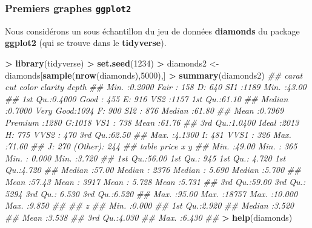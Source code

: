 \documentclass[]{article}
\newenvironment{Shaded}{\begin{snugshade}}{\end{snugshade}}
\newcommand{\CommentTok}[1]{\textcolor[rgb]{0.56,0.35,0.01}{\textit{#1}}}
\newcommand{\DecValTok}[1]{\textcolor[rgb]{0.00,0.00,0.81}{#1}}
\newcommand{\KeywordTok}[1]{\textcolor[rgb]{0.13,0.29,0.53}{\textbf{#1}}}
\newcommand{\NormalTok}[1]{#1}
\newcommand{\OperatorTok}[1]{\textcolor[rgb]{0.81,0.36,0.00}{\textbf{#1}}}
\newcommand{\StringTok}[1]{\textcolor[rgb]{0.31,0.60,0.02}{#1}}
\theoremstyle{definition}
\theoremstyle{definition}
\theoremstyle{definition}
\theoremstyle{remark}
\begin{document}
\hypertarget{premiers-graphes-ggplot2}{%
\subsubsection{\texorpdfstring{Premiers graphes \texttt{ggplot2}}{Premiers graphes ggplot2}}\label{premiers-graphes-ggplot2}}

Nous considérons un sous échantillon du jeu de données \textbf{diamonds} du package \textbf{ggplot2} (qui se trouve dans le \textbf{tidyverse}).

\begin{Shaded}
\begin{Highlighting}[]
\OperatorTok{>}\StringTok{ }\KeywordTok{library}\NormalTok{(tidyverse)}
\OperatorTok{>}\StringTok{ }\KeywordTok{set.seed}\NormalTok{(}\DecValTok{1234}\NormalTok{)}
\OperatorTok{>}\StringTok{ }\NormalTok{diamonds2 <-}\StringTok{ }\NormalTok{diamonds[}\KeywordTok{sample}\NormalTok{(}\KeywordTok{nrow}\NormalTok{(diamonds),}\DecValTok{5000}\NormalTok{),] }
\OperatorTok{>}\StringTok{ }\KeywordTok{summary}\NormalTok{(diamonds2)}
\CommentTok{##      carat               cut       color       clarity         depth      }
\CommentTok{##  Min.   :0.2000   Fair     : 158   D: 640   SI1    :1189   Min.   :43.00  }
\CommentTok{##  1st Qu.:0.4000   Good     : 455   E: 916   VS2    :1157   1st Qu.:61.10  }
\CommentTok{##  Median :0.7000   Very Good:1094   F: 900   SI2    : 876   Median :61.80  }
\CommentTok{##  Mean   :0.7969   Premium  :1280   G:1018   VS1    : 738   Mean   :61.76  }
\CommentTok{##  3rd Qu.:1.0400   Ideal    :2013   H: 775   VVS2   : 470   3rd Qu.:62.50  }
\CommentTok{##  Max.   :4.1300                    I: 481   VVS1   : 326   Max.   :71.60  }
\CommentTok{##                                    J: 270   (Other): 244                  }
\CommentTok{##      table           price             x                y        }
\CommentTok{##  Min.   :49.00   Min.   :  365   Min.   : 0.000   Min.   :3.720  }
\CommentTok{##  1st Qu.:56.00   1st Qu.:  945   1st Qu.: 4.720   1st Qu.:4.720  }
\CommentTok{##  Median :57.00   Median : 2376   Median : 5.690   Median :5.700  }
\CommentTok{##  Mean   :57.43   Mean   : 3917   Mean   : 5.728   Mean   :5.731  }
\CommentTok{##  3rd Qu.:59.00   3rd Qu.: 5294   3rd Qu.: 6.530   3rd Qu.:6.520  }
\CommentTok{##  Max.   :95.00   Max.   :18757   Max.   :10.000   Max.   :9.850  }
\CommentTok{##                                                                  }
\CommentTok{##        z        }
\CommentTok{##  Min.   :0.000  }
\CommentTok{##  1st Qu.:2.920  }
\CommentTok{##  Median :3.520  }
\CommentTok{##  Mean   :3.538  }
\CommentTok{##  3rd Qu.:4.030  }
\CommentTok{##  Max.   :6.430  }
\CommentTok{## }
\OperatorTok{>}\StringTok{ }\KeywordTok{help}\NormalTok{(diamonds)}
\end{Highlighting}
\end{Shaded}
\end{document}
